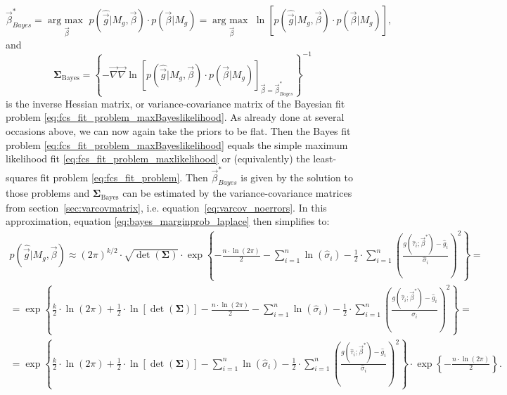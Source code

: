 \documentclass[a4paper,notitlepage]{article}
\DeclareMathOperator*{\argmax}{arg\:max\ }
\newcommand{\mat}[1]{\mathrm{\mathbf{#1}}}
\begin{document}
\begin{equation}\label{eq:fcs_fit_problem_maxBayeslikelihood}
  \vec{\beta}_{Bayes}^\ast=\argmax\limits_{\vec{\beta}}p(\hat{\vec{g}}|M_g,\vec{\beta})\cdot p(\vec{\beta}|M_g)=\argmax\limits_{\vec{\beta}}\ln\left[p(\hat{\vec{g}}|M_g,\vec{\beta})\cdot p(\vec{\beta}|M_g)\right],
\end{equation}
and 
\begin{equation}\label{eq:fcs_fit_problem_invbayeshessian}
  \mat{\Sigma}_\text{Bayes}=\left\{-\vec{\nabla}\vec{\nabla}\ln\left[p(\hat{\vec{g}}|M_g,\vec{\beta})\cdot p(\vec{\beta}|M_g)\right]_{\vec{\beta}=\vec{\beta}_{Bayes}^\ast}\right\}^{-1}
\end{equation}
is the inverse Hessian matrix, or variance-covariance matrix of the Bayesian fit problem \eqref{eq:fcs_fit_problem_maxBayeslikelihood}. As already done at several occasions above, we can now again take the priors to be flat. Then the Bayes fit problem \eqref{eq:fcs_fit_problem_maxBayeslikelihood} equals the simple maximum likelihood fit \eqref{eq:fcs_fit_problem_maxlikelihood} or (equivalently) the least-squares fit problem \eqref{eq:fcs_fit_problem}. Then $\vec{\beta}_{Bayes}^\ast$ is given by the solution to those problems and $\mat{\Sigma}_\text{Bayes}$ can be estimated by the variance-covariance matrices from section~\ref{sec:varcovmatrix}, i.e. equation~\eqref{eq:varcov_noerrors}. In this approximation, 
equation \eqref{eq:bayes_marginprob_laplace} then simplifies to:
\begin{multline}\label{eq:bayes_marginprob_laplace_flatprior}
    p(\hat{\vec{g}}|M_g,\vec{\beta})\approx(2\pi)^{k/2}\cdot\sqrt{\det(\mat{\Sigma})}\cdot \exp\left\{-\frac{n\cdot\ln(2\pi)}{2}-\sum\limits_{i=1}^n\ln(\hat{\sigma}_i)-\frac{1}{2}\cdot\sum\limits_{i=1}^n\left(\frac{g(\hat{\tau}_i;\vec{\beta}^\ast)-\hat{g}_i}{\hat{\sigma}_i}\right)^2\right\}=\\
    =\exp\left\{\frac{k}{2}\cdot\ln(2\pi)+\frac{1}{2}\cdot\ln\left[\det(\mat{\Sigma})\right] -\frac{n\cdot\ln(2\pi)}{2}-\sum\limits_{i=1}^n\ln(\hat{\sigma}_i)-\frac{1}{2}\cdot\sum\limits_{i=1}^n\left(\frac{g(\hat{\tau}_i;\vec{\beta}^\ast)-\hat{g}_i}{\hat{\sigma}_i}\right)^2\right\}=\\
    =\exp\left\{\frac{k}{2}\cdot\ln(2\pi)+\frac{1}{2}\cdot\ln\left[\det(\mat{\Sigma})\right] -\sum\limits_{i=1}^n\ln(\hat{\sigma}_i)-\frac{1}{2}\cdot\sum\limits_{i=1}^n\left(\frac{g(\hat{\tau}_i;\vec{\beta}^\ast)-\hat{g}_i}{\hat{\sigma}_i}\right)^2\right\}\cdot\exp\left\{-\frac{n\cdot\ln(2\pi)}{2}\right\}.
\end{multline}



\newpage


\end{document}
